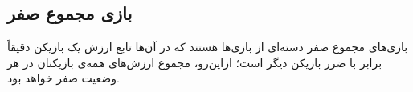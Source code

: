 %
%
%
%
%	
%	
%	


















\subsection{بازی مجموع صفر}

بازی‌های مجموع صفر
دسته‌ای از بازی‌ها هستند که در آن‌ها تابع ارزش یک بازیکن دقیقاً برابر با ضرر بازیکن دیگر است؛ ازاین‌رو، مجموع ارزش‌های همه‌ی بازیکنان در هر وضعیت صفر خواهد بود.

